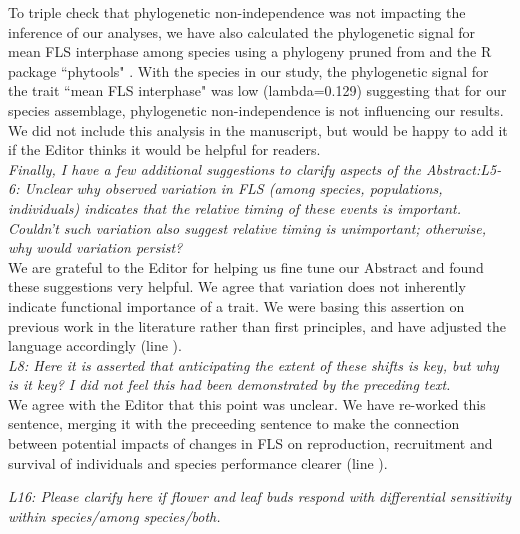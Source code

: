 \documentclass[11pt]{article}
\begin{document}
\noindent To triple check that phylogenetic non-independence was not impacting the inference of our analyses, we have also calculated the phylogenetic signal for mean FLS interphase among species using a phylogeny pruned from \citet{Zanne2013} and the R package ``phytools" \citep{Revell2012}. With the species in our study, the phylogenetic signal for the trait ``mean FLS interphase" was low (lambda=0.129) suggesting that for our species assemblage, phylogenetic non-independence is not influencing our results. We did not include this analysis in the manuscript, but would be happy to add it if the Editor thinks it would be helpful for readers.\\

\emph{Finally, I have a few additional suggestions to clarify aspects of the Abstract:L5-6: Unclear why observed variation in FLS (among species, populations, individuals) indicates that the relative timing of these events is important. Couldn't such variation also suggest relative timing is unimportant; otherwise, why would variation persist?}\\

\noident We are grateful to the Editor for helping us fine tune our Abstract and found these suggestions very helpful. We agree that variation does not inherently indicate functional importance of a trait. We were basing this assertion on previous work in the literature rather than first principles, and have adjusted the language accordingly (line ).\\ %

\emph{L8: Here it is asserted that anticipating the extent of these shifts is key, but why is it key? I did not feel this had been demonstrated by the preceding text.}\\

We agree with the Editor that this point was unclear. We have re-worked this sentence, merging it with the preceeding sentence to make the connection between potential impacts of changes in FLS on reproduction, recruitment and survival of individuals and species performance clearer (line ). %

\emph{L16: Please clarify here if flower and leaf buds respond with differential sensitivity within species/among species/both.}\\
\end{document}
